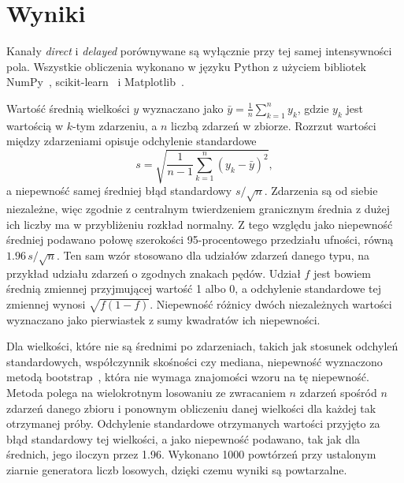 \documentclass[12pt,a4paper]{article}
\begin{document}
\section{Wyniki}
\label{sec:wyniki}

Kanały \emph{direct} i \emph{delayed}
porównywane są wyłącznie przy tej samej intensywności pola. Wszystkie obliczenia wykonano w języku Python z użyciem bibliotek
NumPy~\cite{Harris2020}, scikit-learn~\cite{Pedregosa2011}
i Matplotlib~\cite{Hunter2007}. 

Wartość średnią wielkości $y$ wyznaczano jako
$\bar y=\frac{1}{n}\sum_{k=1}^{n}y_k$, gdzie $y_k$ jest wartością
w $k$-tym zdarzeniu, a $n$ liczbą zdarzeń w zbiorze. Rozrzut wartości
między zdarzeniami opisuje odchylenie standardowe
\begin{equation}
s=\sqrt{\frac{1}{n-1}\sum_{k=1}^{n}\left(y_k-\bar y\right)^2},
\label{eq:s}
\end{equation}
a niepewność samej średniej błąd standardowy $s/\sqrt{n}$. Zdarzenia są
od siebie niezależne, więc zgodnie z centralnym twierdzeniem granicznym
średnia z dużej ich liczby ma w przybliżeniu rozkład normalny. Z tego
względu jako niepewność średniej podawano połowę szerokości
95-procentowego przedziału ufności, równą $\num{1.96}\,s/\sqrt{n}$.
Ten sam wzór stosowano dla udziałów zdarzeń danego typu, na przykład
udziału zdarzeń o zgodnych znakach pędów. Udział $f$ jest bowiem
średnią zmiennej przyjmującej wartość 1 albo 0, a odchylenie
standardowe tej zmiennej wynosi $\sqrt{f(1-f)}$. Niepewność różnicy dwóch
niezależnych wartości wyznaczano jako pierwiastek z sumy kwadratów ich
niepewności.

Dla wielkości, które nie są średnimi po zdarzeniach, takich jak
stosunek odchyleń standardowych, współczynnik skośności czy mediana,
niepewność wyznaczono metodą
bootstrap~\cite{Efron1979}, która nie wymaga znajomości wzoru na tę
niepewność. Metoda polega na wielokrotnym losowaniu ze zwracaniem $n$
zdarzeń spośród $n$ zdarzeń danego zbioru i ponownym obliczeniu danej
wielkości dla każdej tak otrzymanej próby. Odchylenie standardowe
otrzymanych wartości przyjęto za błąd standardowy tej wielkości, a jako
niepewność podawano, tak jak dla średnich, jego iloczyn
przez \num{1.96}. Wykonano \num{1000} powtórzeń przy ustalonym ziarnie
generatora liczb losowych, dzięki czemu wyniki są powtarzalne.
\end{document}
